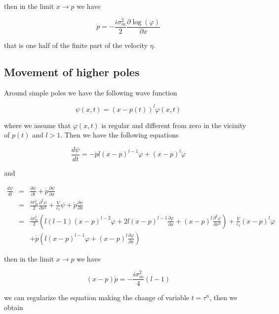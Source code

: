 \documentclass[a4paper,12pt]{article}
\begin{document}
then in the limit $x \rightarrow p$ we have

\begin{equation}
\dot p = - \frac{i \sigma_m^2}{2} \frac{\partial \log(\varphi)}{\partial x}
\end{equation}

that is one half of the finite part of the velocity $\eta$.


\subsection{Movement of higher poles}

Around simple poles we have the following wave function

\begin{equation}
\psi(x,t) = (x-p(t))^l\varphi(x,t)
\end{equation}

where we assume that $\varphi(x,t)$ is regular and different from zero in the vicinity of $p(t)$ and $l>1$. Then we have the following equations

\begin{equation}
\frac{d \psi}{dt}   =  - \dot p l (x-p)^{l-1}\varphi + (x-p)^l \dot \varphi 
\end{equation}

and

\begin{eqnarray}
\frac{d \psi}{dt} & = & \frac{\partial \psi}{\partial t} + \dot p \frac{\partial \psi}{\partial x} \nonumber \\
& = & \frac{i \sigma_m^2}{2} \frac{\partial^2 \psi}{\partial x^2}  + \frac{V}{\varepsilon_t}\psi + \dot p \frac{\partial \psi}{\partial x} \nonumber \\
& = & \frac{i \sigma_m^2}{2} \left(  l(l-1)(x-p)^{l-2}\varphi +   2 l(x-p)^{l-1}\frac{\partial \varphi}{\partial x}  + (x-p)^l\frac{\partial^2 \varphi}{\partial x^2} \right)  + \frac{V}{\varepsilon_t}(x-p)^l\varphi \nonumber \\
&&+ \dot p \left( l(x-p)^{l-1}\varphi + (x-p)^l\frac{\partial \varphi}{\partial x} \right)
\end{eqnarray}

then in the limit $x \rightarrow p$ we have

\begin{equation}
(x-p)\dot p = - \frac{i \sigma_m^2}{4} (l-1)
\end{equation}

we can regularize the equation making the change of variable $t = \tau^n$, then we obtain
\end{document}
